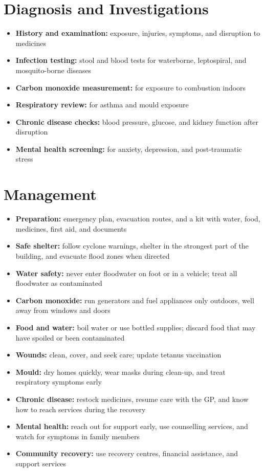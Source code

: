 \section*{Diagnosis and Investigations}
\begin{itemize}
    \item \textbf{History and examination:} exposure, injuries, symptoms, and disruption to medicines
    \item \textbf{Infection testing:} stool and blood tests for waterborne, leptospiral, and mosquito-borne diseases
    \item \textbf{Carbon monoxide measurement:} for exposure to combustion indoors
    \item \textbf{Respiratory review:} for asthma and mould exposure
    \item \textbf{Chronic disease checks:} blood pressure, glucose, and kidney function after disruption
    \item \textbf{Mental health screening:} for anxiety, depression, and post-traumatic stress
\end{itemize}

\section*{Management}
\begin{itemize}
    \item \textbf{Preparation:} emergency plan, evacuation routes, and a kit with water, food, medicines, first aid, and documents
    \item \textbf{Safe shelter:} follow cyclone warnings, shelter in the strongest part of the building, and evacuate flood zones when directed
    \item \textbf{Water safety:} never enter floodwater on foot or in a vehicle; treat all floodwater as contaminated
    \item \textbf{Carbon monoxide:} run generators and fuel appliances only outdoors, well away from windows and doors
    \item \textbf{Food and water:} boil water or use bottled supplies; discard food that may have spoiled or been contaminated
    \item \textbf{Wounds:} clean, cover, and seek care; update tetanus vaccination
    \item \textbf{Mould:} dry homes quickly, wear masks during clean-up, and treat respiratory symptoms early
    \item \textbf{Chronic disease:} restock medicines, resume care with the GP, and know how to reach services during the recovery
    \item \textbf{Mental health:} reach out for support early, use counselling services, and watch for symptoms in family members
    \item \textbf{Community recovery:} use recovery centres, financial assistance, and support services
\end{itemize}

